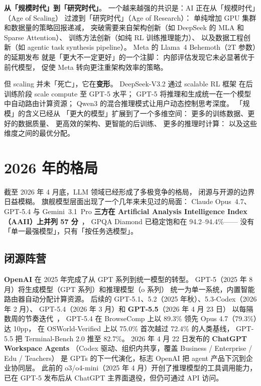 \textbf{从「规模时代」到「研究时代」}。
一个越来越强的共识是：AI 正在从「规模时代」（Age of Scaling）
过渡到「研究时代」（Age of Research）：
单纯增加 GPU 集群和数据量的策略回报递减，
突破需要来自架构创新（如 DeepSeek 的 MLA 和 Sparse Attention）、
训练方法创新（如纯 RL 训练推理能力）、
以及数据工程创新（如 agentic task synthesis pipeline）。
Meta 的 Llama~4 Behemoth（2T 参数）的延期发布
就是「更大不一定更好」的一个注脚：
内部评估发现它未必显著优于前代模型，
促使 Meta 转向更注重架构效率的策略。

但 scaling 并未「死亡」，它在\textbf{变形}。
DeepSeek-V3.2 通过 scalable RL 框架
在后训练阶段 scale compute 至 GPT-5 水平；
GPT-5 将推理和生成统一在一个模型中自动路由计算资源；
Qwen3 的混合推理模式让用户动态控制思考深度。
「规模」的含义已经从
「更大的模型」扩展到了一个多维空间：
更多的训练数据、更好的数据质量、
更高效的架构、更智能的后训练、
更多的推理时计算：
以及这些维度之间的最优分配。

\section{2026 年的格局}

截至 2026 年 4 月底，LLM 领域已经形成了多极竞争的格局，
闭源与开源的边界日益模糊。
旗舰模型层面出现了一个几年来未见过的局面：
Claude Opus~4.7、GPT-5.4 与 Gemini~3.1~Pro
\textbf{三方在 Artificial Analysis Intelligence Index（AAII）上并列 57 分}~\cite{datalearner2026aaii}，
GPQA Diamond 已稳定饱和在 94.2--94.4\%——
没有「单一最强模型」，只有「按任务选模型」。

\subsection{闭源阵营}

\textbf{OpenAI} 在 2025 年完成了从 GPT 系列到统一模型的转型。
GPT-5（2025 年 8 月）将生成模型（GPT 系列）和推理模型（o 系列）
统一为单一系统，内置智能路由器自动分配计算资源。
后续的 GPT-5.1、5.2（2025 年秋）、5.3-Codex（2026 年 2 月）、
GPT-5.4（2026 年 3 月）和 \textbf{GPT-5.5}（2026 年 4 月 23 日）
以每隔数周的节奏迭代~\cite{openaigpt54}，
GPT-5.4 在 BrowseComp 上以 89.3\% 领先 Opus 4.7（79.3\%）达 10pp，
在 OSWorld-Verified 上以 75.0\% 首次越过 72.4\% 的人类基线，
GPT-5.5 把 Terminal-Bench 2.0 推至 82.7\%。
2026 年 4 月 22 日发布的 \textbf{ChatGPT Workspace Agents}
（Codex 驱动、组织内共享，覆盖 Business / Enterprise / Edu / Teachers）
是 GPTs 的下一代演化，标志 OpenAI 把 agent 产品下沉到企业协同层。
此前的 o3/o4-mini（2025 年 4 月）开创了推理模型的工具调用能力，
已在 GPT-5 发布后从 ChatGPT 主界面退役，但仍可通过 API 访问。

